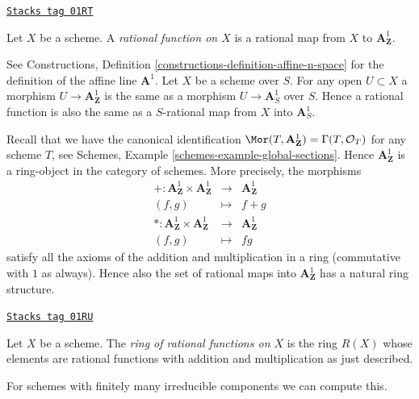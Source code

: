 \begin{definition}
\label{morphisms-definition-rational-function}
\href{https://stacks.math.columbia.edu/tag/01RT}{\texttt{Stacks tag 01RT}}

Let $X$ be a scheme. A {\it rational function on $X$} is a rational map
from $X$ to $\mathbf{A}^1_{\mathbf{Z}}$.
\end{definition}

See Constructions, Definition \ref{constructions-definition-affine-n-space}
for the definition of the affine line $\mathbf{A}^1$. Let $X$ be a scheme
over $S$. For any open $U \subset X$ a morphism
$U \to \mathbf{A}^1_{\mathbf{Z}}$ is the same as a morphism
$U \to \mathbf{A}^1_S$ over $S$. Hence a rational function is
also the same as a $S$-rational map from $X$ into $\mathbf{A}^1_S$.

\medskip\noindent
Recall that we have the canonical identification
$\Mor(T, \mathbf{A}^1_{\mathbf{Z}}) = \Gamma(T, \mathcal{O}_T)$
for any scheme $T$, see Schemes, Example \ref{schemes-example-global-sections}.
Hence $\mathbf{A}^1_{\mathbf{Z}}$ is a ring-object in the
category of schemes. More precisely, the morphisms
\begin{eqnarray*}
+ : \mathbf{A}^1_{\mathbf{Z}} \times \mathbf{A}^1_{\mathbf{Z}}
& \longrightarrow &
\mathbf{A}^1_{\mathbf{Z}} \\
(f, g) & \longmapsto & f + g \\
* : \mathbf{A}^1_{\mathbf{Z}} \times \mathbf{A}^1_{\mathbf{Z}}
& \longrightarrow &
\mathbf{A}^1_{\mathbf{Z}} \\
(f, g) & \longmapsto & fg
\end{eqnarray*}
satisfy all the axioms of the addition and multiplication in a ring
(commutative with $1$ as always). Hence also the set of rational
maps into $\mathbf{A}^1_{\mathbf{Z}}$ has a natural ring structure.

\begin{definition}
\label{morphisms-definition-ring-of-rational-functions}
\href{https://stacks.math.columbia.edu/tag/01RU}{\texttt{Stacks tag 01RU}}

Let $X$ be a scheme. The {\it ring of rational functions on $X$}
is the ring $R(X)$ whose elements are rational functions with
addition and multiplication as just described.
\end{definition}

For schemes with finitely many irreducible components we can compute this.


